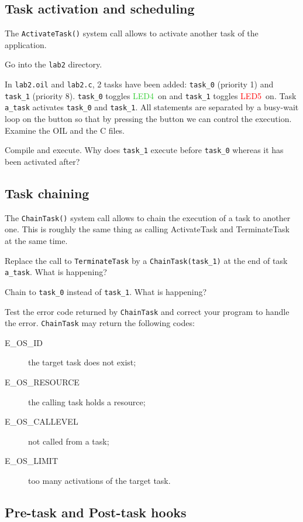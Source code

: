 \documentclass[11pt]{article}
\newcommand{\LEDgreen}{\textcolor{LimeGreen}{LED4}}
\newcommand{\LEDred}{\textcolor{red}{LED5}}
\begin{document}
\subsection{Task activation and scheduling}


The \texttt{ActivateTask()} system call allows to activate another task of the application.

Go into the \texttt{lab2} directory.

In \texttt{lab2.oil} and \texttt{lab2.c}, 2 tasks have been added: \texttt{task_0} (priority 1) and \texttt{task_1} (priority 8). \texttt{task_0} toggles \LEDgreen\ on and \texttt{task_1} toggles \LEDred\ on. Task \texttt{a_task} activates \texttt{task_0} and \texttt{task_1}. All statements are separated by a busy-wait loop on the button so that by pressing the button we can control the execution. Examine the OIL and the C files.

Compile and execute. Why does \texttt{task_1} execute before \texttt{task_0} whereas it has been activated after?

\subsection{Task chaining}

The \texttt{ChainTask()} system call allows to chain the execution of a task to another one. This is roughly the same thing as calling ActivateTask and TerminateTask at the same time.

Replace the call to \texttt{TerminateTask} by a \texttt{ChainTask(task_1)} at the end of task \texttt{a_task}. What is happening?

Chain to \texttt{task_0} instead of \texttt{task_1}. What is happening?

Test the error code returned by \texttt{ChainTask} and correct your program to
handle the error. \texttt{ChainTask} may return the following codes:

\begin{description}
\item[E_OS_ID] the target task does not exist;
\item[E_OS_RESOURCE] the calling task holds a resource;
\item[E_OS_CALLEVEL] not called from a task;
\item[E_OS_LIMIT] too many activations of the target task.
\end{description}

\subsection{Pre-task and Post-task hooks}
\end{document}
